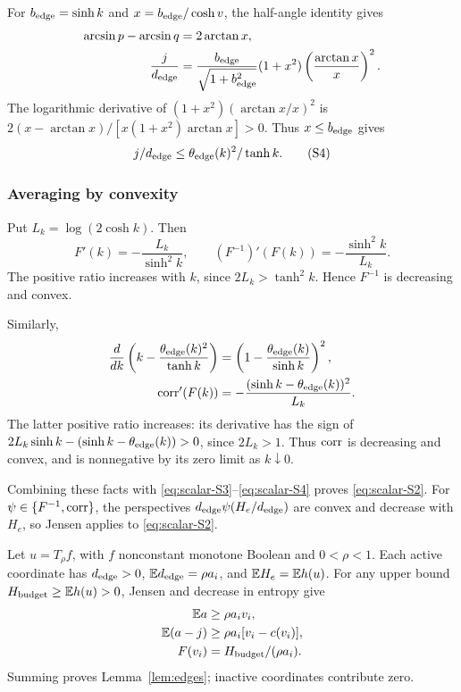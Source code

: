 For \(b_{\rm edge}=\sinh k\) and \(x=b_{\rm edge}/\cosh v\),
the half-angle identity gives
\begin{align*}
 \arcsin p-\arcsin q&=2\arctan x,\\
 \frac{j}{d_{\mathrm{edge}}}
 &=\frac{b_{\rm edge}}{\sqrt{1+b_{\rm edge}^2}}(1+x^2)
   \left(\frac{\arctan x}{x}\right)^2.
\end{align*}
The logarithmic derivative of
\((1+x^2)(\arctan x/x)^2\) is
\(2(x-\arctan x)/[x(1+x^2)\arctan x]>0\). Thus \(x\le b_{\rm edge}\) gives
\[
                         j/d_{\mathrm{edge}} \le\theta_{\rm edge}(k)^2/\tanh k.    \tag{S4}\label{eq:scalar-S4}
\]

\subsubsection{Averaging by convexity}\label{why-the-bounds-can-be-averaged}

Put \(L_k=\log(2\cosh k)\). Then
\[
 F'(k)=-\frac{L_k}{\sinh^2 k},\qquad
 (F^{-1})'(F(k))=-\frac{\sinh^2 k}{L_k}.
\]
The positive ratio increases with \(k\), since \(2L_k>\tanh^2 k\).
Hence \(F^{-1}\) is decreasing and convex.

Similarly,
\begin{align*}
 \frac d{dk}\left(k-\frac{\theta_{\rm edge}(k)^2}{\tanh k}\right)
 &=\left(1-\frac{\theta_{\rm edge}(k)}{\sinh k}\right)^2,\\
 \operatorname{corr}'(F(k))&=-\frac{(\sinh k-\theta_{\rm edge}(k))^2}{L_k}.
\end{align*}
The latter positive ratio increases: its derivative has the sign of
\(2L_k\sinh k-(\sinh k-\theta_{\rm edge}(k))>0\), since \(2L_k>1\).
Thus \(\operatorname{corr}\) is decreasing and convex, and is nonnegative by its
zero limit as \(k\downarrow0\).

Combining these facts with \eqref{eq:scalar-S3}--\eqref{eq:scalar-S4}
proves \eqref{eq:scalar-S2}.
For \(\psi\in\{F^{-1},\operatorname{corr}\}\), the perspectives
\(d_{\mathrm{edge}}\psi(H_e/d_{\mathrm{edge}})\) are convex and decrease with \(H_e\),
so Jensen applies to \eqref{eq:scalar-S2}.

Let \(u=T_\rho f\), with \(f\) nonconstant monotone Boolean and
\(0<\rho<1\). Each active coordinate has \(d_{\mathrm{edge}}>0\),
\(\mathbb Ed_{\mathrm{edge}}=\rho a_i\), and \(\mathbb E H_e=\mathbb E h(u)\).
For any upper bound \(H_{\rm budget}\ge\mathbb E h(u)>0\), Jensen and
decrease in entropy give
\begin{align*}
 \mathbb E a&\ge\rho a_i v_i,\\
 \mathbb E(a-j)&\ge\rho a_i[v_i-c(v_i)],\\
 F(v_i)&=H_{\rm budget}/(\rho a_i).
\end{align*}
Summing proves Lemma~\ref{lem:edges}; inactive coordinates contribute zero.

